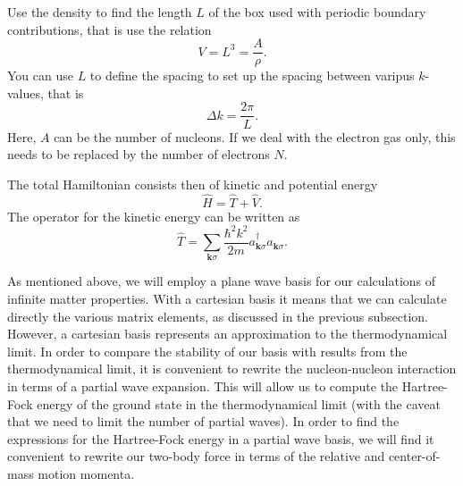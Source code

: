 Use the density to find the length $L$ of the box used with periodic
boundary contributions, that is use the relation
\[
  V= L^3= \frac{A}{\rho}.
\]
You can use $L$ to define the spacing to set up the spacing between
varipus $k$-values, that is
\[
  \Delta k = \frac{2\pi}{L}.
\]
Here, $A$ can be the number of nucleons. If we deal with the electron
gas only, this needs to be replaced by the number of electrons $N$.



The total Hamiltonian consists then of kinetic and potential energy
\[
\hat{H} = \hat{T}+\hat{V}.
\]
The operator for the kinetic energy can be written as
\[
\hat{T}=\sum_{\mathbf{k}\sigma}\frac{\hbar^2k^2}{2m}a_{\mathbf{k}\sigma}^{\dagger}a_{\mathbf{k}\sigma}.
\]



As mentioned above, we will employ a plane wave basis
for our calculations of infinite matter properties. With a cartesian
basis it means that we can calculate directly the various matrix
elements, as discussed in the previous subsection. However, a
cartesian basis represents an approximation to the thermodynamical limit. In
order to compare the stability of our basis with results from the
thermodynamical limit, it is convenient to rewrite the nucleon-nucleon
interaction in terms of a partial wave expansion. This will allow us
to compute the Hartree-Fock energy of the ground state in the
thermodynamical limit (with the caveat that we need to limit the
number of partial waves). In order to find the expressions for the
Hartree-Fock energy in a partial wave basis, we will find it
convenient to rewrite our two-body force in terms of the relative and
center-of-mass motion momenta.

